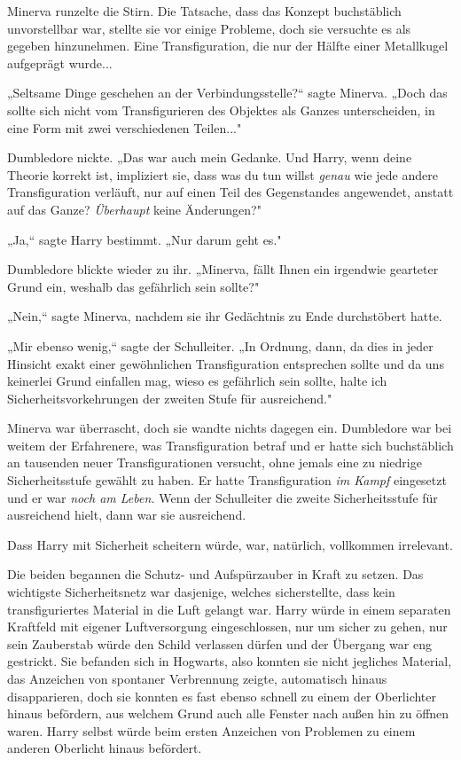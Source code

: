{Minerva runzelte die Stirn. Die Tatsache, dass das Konzept buchstäblich unvorstellbar war, stellte sie vor einige Probleme, doch sie versuchte es als gegeben hinzunehmen. Eine Transfiguration, die nur der Hälfte einer Metallkugel aufgeprägt wurde...

„Seltsame Dinge geschehen an der Verbindungsstelle?“ sagte Minerva. „Doch das sollte sich nicht vom Transfigurieren des Objektes als Ganzes unterscheiden, in eine Form mit zwei verschiedenen Teilen..."

Dumbledore nickte. „Das war auch mein Gedanke. Und Harry, wenn deine Theorie korrekt ist, impliziert sie, dass was du tun willst \emph{genau} wie jede andere Transfiguration verläuft, nur auf einen Teil des Gegenstandes angewendet, anstatt auf das Ganze? \emph{Überhaupt} keine Änderungen?"

„Ja,“ sagte Harry bestimmt. „Nur darum geht es."

Dumbledore blickte wieder zu ihr. „Minerva, fällt Ihnen ein irgendwie gearteter Grund ein, weshalb das gefährlich sein sollte?"

„Nein,“ sagte Minerva, nachdem sie ihr Gedächtnis zu Ende durchstöbert hatte.

„Mir ebenso wenig,“ sagte der Schulleiter. „In Ordnung, dann, da dies in jeder Hinsicht exakt einer gewöhnlichen Transfiguration entsprechen sollte und da uns keinerlei Grund einfallen mag, wieso es gefährlich sein sollte, halte ich Sicherheitsvorkehrungen der zweiten Stufe für ausreichend."

Minerva war überrascht, doch sie wandte nichts dagegen ein. Dumbledore war bei weitem der Erfahrenere, was Transfiguration betraf und er hatte sich buchstäblich an tausenden neuer Transfigurationen versucht, ohne jemals eine zu niedrige Sicherheitsstufe gewählt zu haben. Er hatte Transfiguration \emph{im Kampf} eingesetzt und er war \emph{noch am Leben.} Wenn der Schulleiter die zweite Sicherheitsstufe für ausreichend hielt, dann war sie ausreichend.

Dass Harry mit Sicherheit scheitern würde, war, natürlich, vollkommen irrelevant.

Die beiden begannen die Schutz- und Aufspürzauber in Kraft zu setzen. Das wichtigste Sicherheitsnetz war dasjenige, welches sicherstellte, dass kein transfiguriertes Material in die Luft gelangt war. Harry würde in einem separaten Kraftfeld mit eigener Luftversorgung eingeschlossen, nur um sicher zu gehen, nur sein Zauberstab würde den Schild verlassen dürfen und der Übergang war eng gestrickt. Sie befanden sich in Hogwarts, also konnten sie nicht jegliches Material, das Anzeichen von spontaner Verbrennung zeigte, automatisch hinaus disapparieren, doch sie konnten es fast ebenso schnell zu einem der Oberlichter hinaus befördern, aus welchem Grund auch alle Fenster nach außen hin zu öffnen waren. Harry selbst würde beim ersten Anzeichen von Problemen zu einem anderen Oberlicht hinaus befördert.

}
